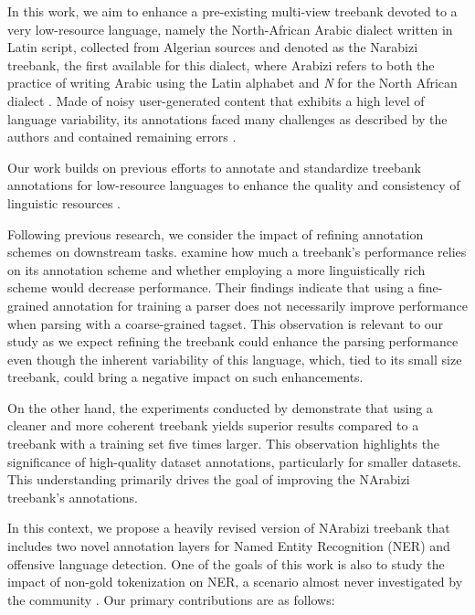 In this work, we aim to enhance a pre-existing multi-view
treebank  devoted to a very low-resource language, namely the North-African Arabic dialect written in
Latin script, collected from Algerian sources and denoted as the
Narabizi treebank, the first
 available for this dialect, where Arabizi refers to both the practice of
 writing Arabic using the Latin alphabet and \textit{N} for the North
 African dialect  \cite{seddah-etal-2020-building}. 
Made of noisy user-generated content that exhibits a high level of
language variability, its annotations faced many challenges as
described by the authors and contained remaining errors \cite{touileb-barnes-2021-interplay}. 

Our work builds on previous efforts to annotate and standardize
treebank annotations for low-resource languages to enhance the quality
and consistency of linguistic resources
\cite{schluter2007preparing,sade-etal-2018-hebrew,turk-etal-2019-turkish,zariquiey-etal-2022-building}.

 Following previous research, we consider the impact of refining
 annotation schemes on downstream tasks.
 \citet{mille-etal-2012-granularity} examine how much a treebank's
 performance relies on its annotation scheme and whether employing a
 more linguistically rich scheme would decrease performance. Their
 findings indicate that using a fine-grained annotation for training a
 parser does not necessarily improve performance when parsing with a
 coarse-grained tagset. This observation is relevant to our study as
 we expect refining the treebank could enhance the parsing
 performance even though the inherent variability of this language,
 which, tied to its  small size treebank, could bring a negative impact on such
 enhancements.  

 On the other hand, the experiments conducted by
 \citet{schluter2007preparing} demonstrate that using a cleaner and
 more coherent treebank yields superior results compared to a treebank
 with a training set five times larger. This observation highlights
 the significance of high-quality dataset annotations, particularly
 for smaller datasets. This understanding primarily drives the goal of
 improving the NArabizi treebank's annotations.

 In this context, we propose a heavily revised version of NArabizi
 treebank \cite{seddah-etal-2020-building} that includes two novel
 annotation layers for Named Entity Recognition (NER) and offensive
 language detection. One of the goals of this work is also to study the
 impact of non-gold tokenization on NER, a scenario almost never investigated
by the community \cite{bareket-tsarfaty-2021-neural}.
Our primary contributions are as follows:

